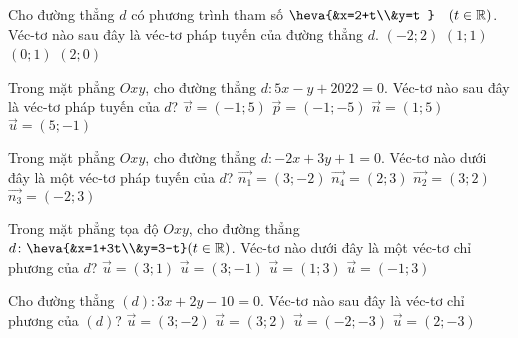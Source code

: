 \begin{ex}%
	Cho đường thẳng $d$ có phương trình tham số $\heva{&x=2+t\\&y=t }\quad (t\in \mathbb{R})$. Véc-tơ nào sau đây là véc-tơ pháp tuyến của đường thẳng $d$.
	\choice
	{\True $(-2;2)$}
	{$(1;1)$}
	{$(0;1)$}
	{$(2;0)$}
\end{ex}


\begin{ex}%
	Trong mặt phẳng $Oxy$, cho đường thẳng $d\colon 5x-y+2022=0$. Véc-tơ nào sau đây là véc-tơ pháp tuyến của $d$?
	\choice
	{$\overrightarrow{v}=\left(-1;5\right)$}
	{$\overrightarrow{p}=\left(-1;-5\right)$}
	{$\overrightarrow{n}=\left(1;5\right)$}
	{\True $\overrightarrow{u}=\left(5;-1\right)$}
\end{ex}


\begin{ex}%
	Trong mặt phẳng $Oxy$, cho đường thẳng $d: -2x+3y+1=0$. Véc-tơ nào dưới đây là một véc-tơ pháp tuyến của $d$?
	\choice
	{$\overrightarrow{n_1}=(3;-2)$}
	{$\overrightarrow{n_4}=(2;3)$}
	{$\overrightarrow{n_2}=(3;2)$}
	{\True $\overrightarrow{n_3}=(-2;3)$}
\end{ex}


\begin{ex}%
	Trong mặt phẳng tọa độ $O x y$, cho đường thẳng $d\colon \heva{&x=1+3t\\&y=3-t} (t \in \mathbb{R})$. Véc-tơ nào dưới đây là một véc-tơ chỉ phương của $d$?
	\choice
	{$\overrightarrow{u}=(3; 1)$}
	{\True $\overrightarrow{u}=(3;-1)$}
	{$\overrightarrow{u}=(1; 3)$}
	{$\overrightarrow{u}=(-1; 3)$}
	\loigiai{
	}
\end{ex}


\begin{ex}%
	Cho đường thẳng $(d)\colon 3x+2y-10=0$. Véc-tơ  nào sau đây là véc-tơ chỉ phương của $(d)$?
	\choice
	{$\overrightarrow{u}=(3;-2) $}
	{$\overrightarrow{u}=(3;2) $}
	{$\overrightarrow{u}=(-2;-3) $}
	{\True $\overrightarrow{u}=(2;-3) $}
\end{ex}


